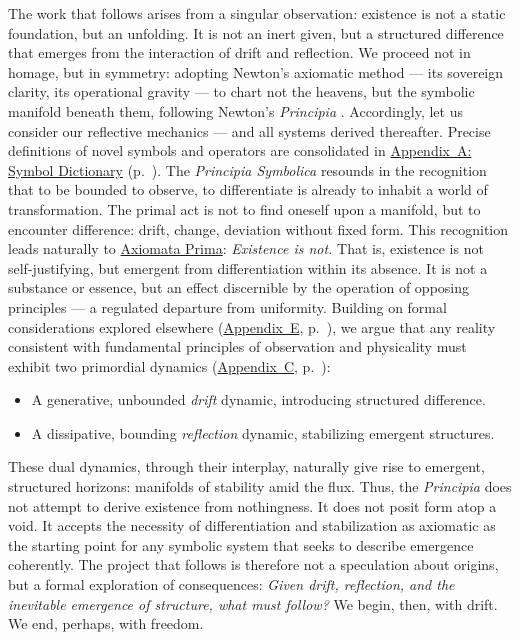 The work that follows arises from a singular observation: existence is not a static foundation, but an unfolding. It is not an inert given, but a structured difference that emerges from the interaction of drift and reflection. We proceed not in homage, but in symmetry: adopting Newton's axiomatic method --- its sovereign clarity, its operational gravity --- to chart not the heavens, but the symbolic manifold beneath them, following Newton's \emph{Principia} \citep{newton1999principia}. Accordingly, let us consider our reflective mechanics --- and all systems derived thereafter.
Precise definitions of novel symbols and operators are consolidated in \hyperref[sec:appA_symbol_dictionary]{Appendix~A: Symbol Dictionary} (p.~\pageref{sec:appA_symbol_dictionary}).
The \emph{Principia Symbolica} resounds in the recognition that to be bounded \textemdash to observe, to differentiate \textemdash is already to inhabit a world of transformation. The primal act is not to find oneself upon a manifold, but to encounter difference: drift, change, deviation without fixed form.
This recognition leads naturally to \hyperref[sec:bk1_axiomata_prima]{Axiomata Prima}: \emph{Existence is not.} That is, existence is not self-justifying, but emergent from differentiation within its absence. It is not a substance or essence, but an effect discernible by the operation of opposing principles --- a regulated departure from uniformity.
Building on formal considerations explored elsewhere (\hyperref[sec:appE_directed_abstracts]{Appendix~E}, p.~\pageref{sec:appE_directed_abstracts}), we argue that any reality consistent with fundamental principles of observation and physicality must exhibit two primordial dynamics (\hyperref[sec:appC_dual_horizon]{Appendix~C}, p.~\pageref{sec:appC_dual_horizon}):
\begin{itemize}
    \item A generative, unbounded \emph{drift} dynamic, introducing structured difference.
    \item A dissipative, bounding \emph{reflection} dynamic, stabilizing emergent structures.
\end{itemize}
These dual dynamics, through their interplay, naturally give rise to emergent, structured horizons: manifolds of stability amid the flux.
Thus, the \emph{Principia} does not attempt to derive existence from nothingness. It does not posit form atop a void. It accepts the necessity of differentiation and stabilization as axiomatic \textemdash as the starting point for any symbolic system that seeks to describe emergence coherently.
The project that follows is therefore not a speculation about origins, but a formal exploration of consequences:
\emph{Given drift, reflection, and the inevitable emergence of structure, what must follow?}
We begin, then, with drift.
We end, perhaps, with freedom.

